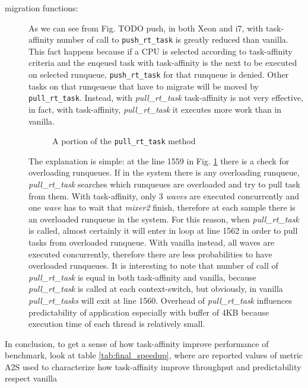 \begin{description}
\item[migration functions:] As we can see from Fig. TODO push, in both Xeon and i7, with task-affinity number of call to \texttt{push\_rt\_task} is greatly 
reduced than vanilla. This fact happens because if a CPU is selected according to task-affinity criteria and the enqeued task with task-affinity is the 
next to be executed on selected runqueue, \texttt{push\_rt\_task} for that runqueue is denied. Other tasks on that runqeueue that have to migrate will be 
moved by \texttt{pull\_rt\_task}. Instead, with \textit{pull\_rt\_task} task-affinity is not very effective, in fact, with task-affinity, 
\textit{pull\_rt\_task} it executes more work than in vanilla.

\begin{figure}[h]
  \lstset{basicstyle=\footnotesize, language=c, captionpos=b, frame=single,label=lis:steps}
  
  \label{code:pull_task}
  \caption{A portion of the \texttt{pull\_rt\_task} method}
\end{figure}

The explanation is simple: at the line 1559 in Fig. \ref{code:pull_task} there is a check for overloading runqueues. If in the system there is any 
overloading runqueue, \textit{pull\_rt\_task} searches which runqueues are overloaded and try to pull task from them. With task-affinity, only 3 
\textit{waves} are executed concurrently and one \textit{wave} has to wait that \textit{mixer2} finish, therefore at each sample there is an overloaded 
runqueue in the system. For this reason, when \textit{pull\_rt\_task} is called, almost certainly it will enter in loop at line 1562 in order to pull tasks 
from overloaded runqueue. With vanilla instead, all waves are executed concurrently, therefore there are less probabilities to have overloaded runqueues. 
It is interesting to note that number of call of \textit{pull\_rt\_task} is equal in both task-affinity and vanilla, because \textit{pull\_rt\_task} 
is called at each context-switch, but obviously, in vanilla \textit{pull\_rt\_tasks} will exit at line 1560. Overhead of \textit{pull\_rt\_task} 
influences predictability of application especially with buffer of 4KB because execution time of each thread is relatively small.

\end{description}

In conclusion, to get a sense of how task-affinity improve performance of benchmark, look at table \ref{tab:final_speedup}, where are reported values of 
metric A2S used to characterize how task-affinity improve throughput and predictability respect vanilla

